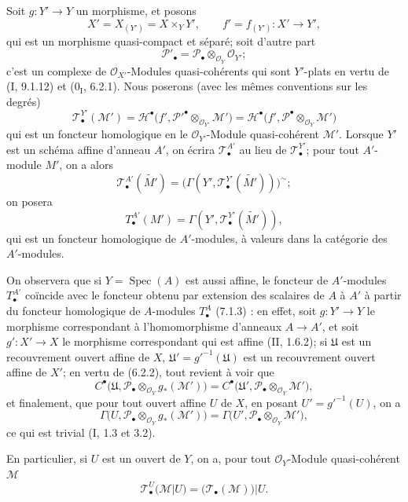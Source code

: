 \begin{env}[7.7.2]
Soit $g:Y'\to Y$ un morphisme, et posons
\[
  X'=X_{(Y')}=X\times_Y Y',
  \qquad
  f'=f_{(Y')}:X'\longrightarrow Y',
\]
qui est un morphisme quasi-compact et séparé; soit d'autre part
\[
  \mathscr P'_\bullet
  =\mathscr P_\bullet\otimes_{\mathscr O_Y}\mathscr O_{Y'};
\]
c'est un complexe de $\mathscr O_{X'}$-Modules quasi-cohérents qui sont
$Y'$-plats en vertu de (I, 9.1.12) et ($0_{\mathrm I}$, 6.2.1). Nous poserons
(avec les mêmes conventions sur les degrés)
\[
  \mathscr T^{Y'}_\bullet(\mathscr M')
  =\mathscr H^\bullet
    \bigl(f',\mathscr P'^\bullet\otimes_{\mathscr O_{Y'}}\mathscr M'\bigr)
  =\mathscr H^\bullet
    \bigl(f',\mathscr P^\bullet\otimes_{\mathscr O_Y}\mathscr M'\bigr)
  \tag{7.7.2.1}\label{III.7.7.2.1.fr}
\]
qui est un foncteur homologique en le $\mathscr O_{Y'}$-Module quasi-cohérent
$\mathscr M'$. Lorsque $Y'$ est un schéma affine d'anneau $A'$, on écrira
$\mathscr T^{A'}_\bullet$ au lieu de $\mathscr T^{Y'}_\bullet$; pour tout
$A'$-module $M'$, on a alors
\[
  \mathscr T^{A'}_\bullet(\widetilde{M'})
  =\bigl(\Gamma(Y',\mathscr T^{Y'}_\bullet(\widetilde{M'}))\bigr)^\sim;
\]
on posera
\[
  T^{A'}_\bullet(M')
  =\Gamma(Y',\mathscr T^{Y'}_\bullet(\widetilde{M'})),
\]
qui est un foncteur homologique de $A'$-modules, à valeurs dans la catégorie des
$A'$-modules.

On observera que si $Y=\operatorname{Spec}(A)$ est aussi affine, le foncteur de
$A'$-modules $T^{A'}_\bullet$ coïncide avec le foncteur obtenu par extension des
scalaires de $A$ à $A'$ à partir du foncteur homologique de $A$-modules
$T^A_\bullet$ (7.1.3) : en effet, soit $g:Y'\to Y$ le morphisme correspondant à
l'homomorphisme d'anneaux $A\to A'$, et soit $g':X'\to X$ le morphisme
correspondant qui est affine (II, 1.6.2); si $\mathfrak U$ est un recouvrement
ouvert affine de $X$, $\mathfrak U'=g'^{-1}(\mathfrak U)$ est un recouvrement
ouvert affine de $X'$; en vertu de (6.2.2), tout revient à voir que
\[
  C^\bullet
    \bigl(\mathfrak U,
      \mathscr P_\bullet\otimes_{\mathscr O_Y}g_*(\mathscr M')\bigr)
  =C^\bullet
    \bigl(\mathfrak U',
      \mathscr P_\bullet\otimes_{\mathscr O_Y}\mathscr M'\bigr),
\]
et finalement, que pour tout ouvert affine $U$ de $X$, en posant
$U'=g'^{-1}(U)$, on a
\[
  \Gamma
    \bigl(U,\mathscr P_\bullet\otimes_{\mathscr O_Y}g_*(\mathscr M')\bigr)
  =\Gamma
    \bigl(U',\mathscr P_\bullet\otimes_{\mathscr O_Y}\mathscr M'\bigr),
\]
ce qui est trivial (I, 1.3 et 3.2).

En particulier, si $U$ est un ouvert de $Y$, on a, pour tout
$\mathscr O_Y$-Module quasi-cohérent $\mathscr M$
\[
  \mathscr T^U_\bullet(\mathscr M|U)
  =\bigl(\mathscr T_\bullet(\mathscr M)\bigr)|U.
  \tag{7.7.2.2}\label{III.7.7.2.2.fr}
\]
\end{env}


